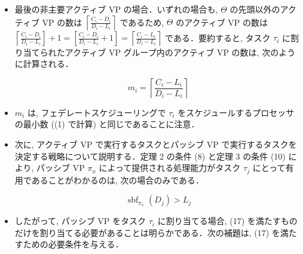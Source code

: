 \begin{frame}{}
    \begin{itemize}
        \item 最後の非主要アクティブ VP の場合．いずれの場合も, $\Theta$ の先頭以外のアクティブ VP の数は $\left\lceil\frac{C_{i}-D_{i}}{D_{i}-L_{i}}\right\rceil$ であるため, $\Theta$ のアクティブ VP の数は $\left\lceil\frac{C_{i}-D_{i}}{D_{i}-L_{i}}\right]+1=\left[\frac{C_{i}-D_{i}}{D_{i}-L_{i}}+1\right]=\left\lceil\frac{C_{i}-L_{i}}{D_{i}-L_{i}}\right\rceil$ である．要約すると, タスク $\tau_{i}$ に割り当てられたアクティブ VP グループ内のアクティブ VP の数は, 次のように計算される．

              \begin{equation*}
                  m_{i}=\left\lceil\frac{C_{i}-L_{i}}{D_{i}-L_{i}}\right\rceil
              \end{equation*}

        \item $m_{i}$ は, フェデレートスケジューリングで $\tau_{i}$ をスケジュールするプロセッサの最小数 ((1) で計算) と同じであることに注意．
    \end{itemize}
\end{frame}

\begin{frame}{}
    \begin{itemize}
        \item 次に, アクティブ VP で実行するタスクとパッシブ VP で実行するタスクを決定する戦略について説明する．定理 2 の条件 (8) と定理 3 の条件 (10) により, パッシブ VP $\pi_{x}$ によって提供される処理能力がタスク $\tau_{j}$ にとって有用であることがわかるのは, 次の場合のみである．

              \begin{equation*}
                  \operatorname{sbf}_{\pi_{x}}\left(D_{j}\right)>L_{j}
              \end{equation*}
    \end{itemize}
\end{frame}

\begin{frame}{}
    \begin{itemize}
        \item したがって, パッシブ VP をタスク $\tau_{i}$ に割り当てる場合, (17) を満たすものだけを割り当てる必要があることは明らかである．次の補題は, (17) を満たすための必要条件を与える．
    \end{itemize}
\end{frame}

